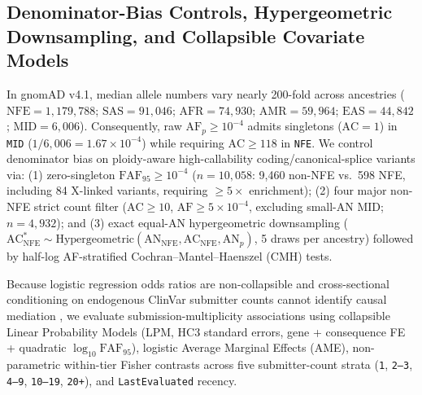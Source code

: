 \documentclass[11pt,letterpaper]{article}
\begin{document}
\subsection{Denominator-Bias Controls, Hypergeometric Downsampling, and Collapsible Covariate Models}
In gnomAD v4.1, median allele numbers vary nearly 200-fold across ancestries ($\mathrm{NFE}=1,179,788$; $\mathrm{SAS}=91,046$; $\mathrm{AFR}=74,930$; $\mathrm{AMR}=59,964$; $\mathrm{EAS}=44,842$; $\mathrm{MID}=6,006$). Consequently, raw $\mathrm{AF}_p\ge 10^{-4}$ admits singletons ($\mathrm{AC}=1$) in \texttt{MID} ($1/6,006 = 1.67\times 10^{-4}$) while requiring $\mathrm{AC}\ge 118$ in \texttt{NFE}. We control denominator bias on ploidy-aware high-callability coding/canonical-splice variants via: (1) zero-singleton $\mathrm{FAF}_{95}\ge 10^{-4}$ ($n=10,058$: 9,460 non-NFE vs.\ 598 NFE, including 84 X-linked variants, requiring $\ge 5\times$ enrichment); (2) four major non-NFE strict count filter ($\mathrm{AC}\ge 10$, $\mathrm{AF}\ge 5\times 10^{-4}$, excluding small-AN MID; $n=4,932$); and (3) exact equal-AN hypergeometric downsampling ($\mathrm{AC}_{\mathrm{NFE}}^* \sim \mathrm{Hypergeometric}(\mathrm{AN}_{\mathrm{NFE}}, \mathrm{AC}_{\mathrm{NFE}}, \mathrm{AN}_p)$, 5 draws per ancestry) followed by half-log AF-stratified Cochran--Mantel--Haenszel (CMH) tests.

Because logistic regression odds ratios are non-collapsible \citep{mood2010logistic} and cross-sectional conditioning on endogenous ClinVar submitter counts cannot identify causal mediation \citep{imai2010mediation}, we evaluate submission-multiplicity associations using collapsible Linear Probability Models (LPM, HC3 standard errors, gene + consequence FE + quadratic $\log_{10}\mathrm{FAF}_{95}$), logistic Average Marginal Effects (AME), non-parametric within-tier Fisher contrasts across five submitter-count strata (\texttt{1}, \texttt{2--3}, \texttt{4--9}, \texttt{10--19}, \texttt{20+}), and \texttt{LastEvaluated} recency.
\end{document}
